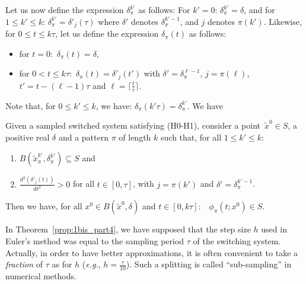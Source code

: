 Let us now
define the expression $\delta_\pi^{k'}$
as follows:
For $k'=0$: $\delta_{\pi}^{k'}=\delta$,
and for $1\leq k'\leq k$: $\delta^{k'}_{\pi}=\delta'_j(\tau)$
where $\delta'$ denotes $\delta^{k'-1}_{\pi}$, and $j$ denotes
$\pi(k')$.
Likewise, for $0\leq t\leq k\tau$, let us
define the expression $\delta_{\pi}(t)$  as follows:
\begin{itemize}
\item for $t=0$:\ $\delta_\pi(t)=\delta$,
\item for $0<t\leq k\tau$:\
$\delta_{\pi}(t)=\delta'_{j}(t')$ with
$\delta'=\delta_\pi^{\ell-1}$, $j=\pi(\ell)$,
$t'=t-(\ell-1)\tau$ and
$\ell=\lceil \frac{t}{\tau}\rceil$.
\end{itemize}
Note that, for $0\leq k'\leq k$, we have:
$\delta_{\pi}(k'\tau)=\delta_\pi^{k'}$. We have
\begin{theorem}\label{th:safety}
  Given a sampled switched system satisfying (H0-H1), consider a
  point~$\tilde{x}^0\in S$, a positive real $\delta$ and a pattern
  $\pi$ of length $k$ such that, for all $1\leq k'\leq k$:
  \begin{enumerate}
  \item $B(\tilde{x}_\pi^{k'}, \delta_{\pi}^{k'}) \subseteq S$ and
  \item $\frac{d^2(\delta'_j(t))}{dt^2}>0$ for all $t\in [0,\tau]$,
    with $j=\pi(k')$ and $\delta'=\delta_\pi^{k'-1}$.
  \end{enumerate}
  Then we have, for all $x^0\in B(\tilde{x}^0,\delta)$ and $t\in
  [0,k\tau]$:\ \ $\phi_{\pi}(t;x^0)\in S$.
\label{prop:1bis_part4}
\end{theorem}

\begin{remark}
  In Theorem~\ref{prop:1bis_part4}, we have supposed that the step size $h$
  used in Euler's method was equal to the sampling period $\tau$ of
  the switching system.  Actually, in order to have better
  approximations, it is often convenient to take a {\em fraction} of
  $\tau$ as for $h$ (\textit{e.g.}, $h=\frac{\tau}{10}$).  Such a
  splitting is called ``sub-sampling'' in numerical methods.
\end{remark}


